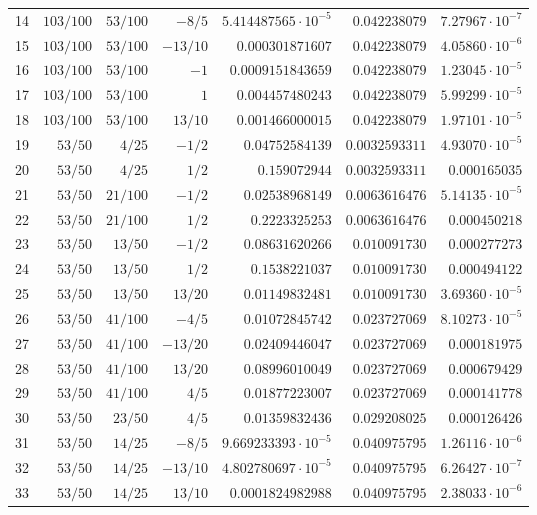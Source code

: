 \documentclass[11pt,reqno]{amsart}
\numberwithin{equation}{section}
\theoremstyle{definition}
\theoremstyle{remark}
\begin{document}
\begin{center}
\begin{longtable}{@{}rrrrrrr@{}}
14 & $103/100$ & $53/100$ & $-8/5$ & $5.414487565\cdot10^{-5}$ & $0.042238079$ & $7.27967\cdot10^{-7}$\\
15 & $103/100$ & $53/100$ & $-13/10$ & $0.000301871607$ & $0.042238079$ & $4.05860\cdot10^{-6}$\\
16 & $103/100$ & $53/100$ & $-1$ & $0.0009151843659$ & $0.042238079$ & $1.23045\cdot10^{-5}$\\
17 & $103/100$ & $53/100$ & $1$ & $0.004457480243$ & $0.042238079$ & $5.99299\cdot10^{-5}$\\
18 & $103/100$ & $53/100$ & $13/10$ & $0.001466000015$ & $0.042238079$ & $1.97101\cdot10^{-5}$\\
19 & $53/50$ & $4/25$ & $-1/2$ & $0.04752584139$ & $0.0032593311$ & $4.93070\cdot10^{-5}$\\
20 & $53/50$ & $4/25$ & $1/2$ & $0.159072944$ & $0.0032593311$ & $0.000165035$\\
21 & $53/50$ & $21/100$ & $-1/2$ & $0.02538968149$ & $0.0063616476$ & $5.14135\cdot10^{-5}$\\
22 & $53/50$ & $21/100$ & $1/2$ & $0.2223325253$ & $0.0063616476$ & $0.000450218$\\
23 & $53/50$ & $13/50$ & $-1/2$ & $0.08631620266$ & $0.010091730$ & $0.000277273$\\
24 & $53/50$ & $13/50$ & $1/2$ & $0.1538221037$ & $0.010091730$ & $0.000494122$\\
25 & $53/50$ & $13/50$ & $13/20$ & $0.01149832481$ & $0.010091730$ & $3.69360\cdot10^{-5}$\\
26 & $53/50$ & $41/100$ & $-4/5$ & $0.01072845742$ & $0.023727069$ & $8.10273\cdot10^{-5}$\\
27 & $53/50$ & $41/100$ & $-13/20$ & $0.02409446047$ & $0.023727069$ & $0.000181975$\\
28 & $53/50$ & $41/100$ & $13/20$ & $0.08996010049$ & $0.023727069$ & $0.000679429$\\
29 & $53/50$ & $41/100$ & $4/5$ & $0.01877223007$ & $0.023727069$ & $0.000141778$\\
30 & $53/50$ & $23/50$ & $4/5$ & $0.01359832436$ & $0.029208025$ & $0.000126426$\\
31 & $53/50$ & $14/25$ & $-8/5$ & $9.669233393\cdot10^{-5}$ & $0.040975795$ & $1.26116\cdot10^{-6}$\\
32 & $53/50$ & $14/25$ & $-13/10$ & $4.802780697\cdot10^{-5}$ & $0.040975795$ & $6.26427\cdot10^{-7}$\\
33 & $53/50$ & $14/25$ & $13/10$ & $0.0001824982988$ & $0.040975795$ & $2.38033\cdot10^{-6}$\\

\end{longtable}
\end{center}
\end{document}
